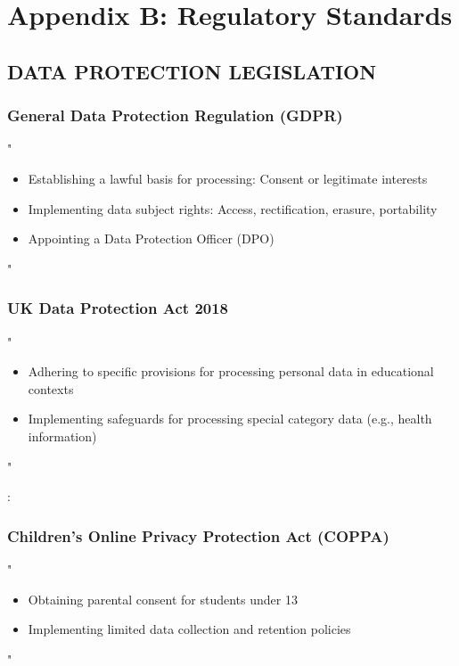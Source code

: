 \documentclass[14pt,a4paper]{article}
\begin{document}
\newpage

\section{Appendix B: Regulatory Standards}\label{appendix:b}

\subsection*{DATA PROTECTION LEGISLATION}

\subsubsection*{General Data Protection Regulation (GDPR)}
"
\begin{itemize}
    \item Establishing a lawful basis for processing: Consent or legitimate interests
    \item Implementing data subject rights: Access, rectification, erasure, portability
    \item Appointing a Data Protection Officer (DPO)
\end{itemize}
"

\textit{\parencite{EU2016}}

\subsubsection*{UK Data Protection Act 2018}
"
\begin{itemize}
    \item Adhering to specific provisions for processing personal data in educational contexts
    \item Implementing safeguards for processing special category data (e.g., health information)
\end{itemize}
"

\textit{\parencite{UKGov2018}}:

\subsubsection*{Children's Online Privacy Protection Act (COPPA)}
"
\begin{itemize}
    \item Obtaining parental consent for students under 13
    \item Implementing limited data collection and retention policies
\end{itemize}
"
\end{document}
